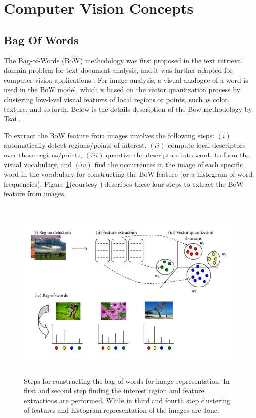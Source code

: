 \section{Computer Vision Concepts}
\subsection{Bag Of Words}
The Bag-of-Words (BoW) methodology was first proposed in the text retrieval domain problem for text document analysis, and it was further adapted for computer vision applications \cite{bosch_best}. For image analysis, a visual analogue of a word is used in the BoW model, which is based on the vector quantization process by clustering low-level visual features of local regions or points, such as color, texture, and so forth. Below is the details description of the Bow methodology by Tsai \cite{tsai2012bag}.

To extract the BoW feature from images involves the following steps: $(i)$ automatically detect regions/points of interest, $(ii)$ compute local descriptors over those regions/points, $(iii)$ quantize the descriptors into words to form the visual vocabulary, and $(iv)$ find the occurrences in the image of each specific word in the vocabulary for constructing the BoW feature (or a histogram of word frequencies). Figure \ref{fig:bow_flow}(courtesy \cite{tsai2012bag}) describes these four steps to extract the BoW feature from images.

\begin{figure}[h]
\centering
\includegraphics[width=\columnwidth,height=9cm]{figures/bow_flow.jpg}
\caption{Steps for constructing the bag-of-words for image representation. In first and second step finding the interest region and feature extractions are performed. While in third and fourth step clustering of features and histogram representation of the images are done.}
\label{fig:bow_flow}
\end{figure}

